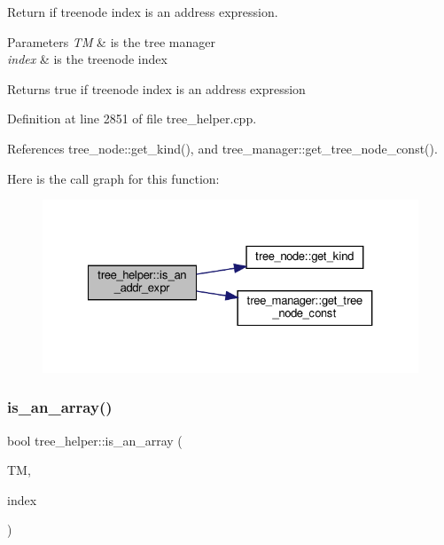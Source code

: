 Return if treenode index is an address expression. 


\begin{DoxyParams}{Parameters}
{\em TM} & is the tree manager \\
\hline
{\em index} & is the treenode index \\
\hline
\end{DoxyParams}
\begin{DoxyReturn}{Returns}
true if treenode index is an address expression 
\end{DoxyReturn}


Definition at line 2851 of file tree\+\_\+helper.\+cpp.



References tree\+\_\+node\+::get\+\_\+kind(), and tree\+\_\+manager\+::get\+\_\+tree\+\_\+node\+\_\+const().

Here is the call graph for this function\+:
\nopagebreak
\begin{figure}[H]
\begin{center}
\leavevmode
\includegraphics[width=327pt]{d7/d99/classtree__helper_a171004a12f78c6e98111be0d1c3b857a_cgraph}
\end{center}
\end{figure}
\mbox{\label{classtree__helper_a66c316e257537a7af62192751c0fb26a}} 
\subsubsection{\texorpdfstring{is\+\_\+an\+\_\+array()}{is\_an\_array()}}
{\footnotesize\ttfamily bool tree\+\_\+helper\+::is\+\_\+an\+\_\+array (\begin{DoxyParamCaption}\item[{const \hyperlink{tree__manager_8hpp_a792e3f1f892d7d997a8d8a4a12e39346}{tree\+\_\+manager\+Const\+Ref} \&}]{TM,  }\item[{const unsigned int}]{index }\end{DoxyParamCaption})\hspace{0.3cm}{\ttfamily [static]}}



